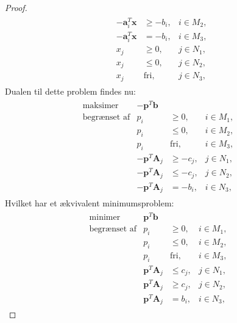 \begin{proof}
\begin{align*}
\begin{array}{lrll}
					&-\textbf{a}_i^T\textbf{x}	&\geq -b_i,	&i \in M_2,\\
					&-\textbf{a}_i^T\textbf{x}	& = -b_i,	&i \in M_3,\\
					&x_j					&\geq 0,	&j \in N_1,\\
					&x_j					&\leq 0,	&j \in N_2,\\							&x_j					&\text{fri},	&j \in N_3,
\end{array}
\end{align*}
Dualen til dette problem findes nu:
\begin{align*}
\begin{array}{lrll}
\text{maksimer}		&-\textbf{p}^T\textbf{b}	&			&\\
\text{begrænset af}	&p_i					&\geq 0,	&i \in M_1,\\
					&p_i					&\leq 0,	&i \in M_2,\\
					&p_i					&\text{fri},	&i \in M_3,\\
					&-\textbf{p}^T\textbf{A}_j	&\geq -c_j,	&j \in N_1,\\
					&-\textbf{p}^T\textbf{A}_j	&\leq -c_j,	&j \in N_2,\\
					&-\textbf{p}^T\textbf{A}_j	& = -b_i,	&i \in N_3,
\end{array}
\end{align*}
Hvilket har et ækvivalent minimumsproblem:
\begin{align*}
\begin{array}{lrll}
\text{minimer}		&\textbf{p}^T\textbf{b}	&			&\\
\text{begrænset af}	&p_i					&\geq 0,	&i \in M_1,\\
					&p_i					&\leq 0,	&i \in M_2,\\
					&p_i					&\text{fri},	&i \in M_3,\\
					&\textbf{p}^T\textbf{A}_j	&\leq c_j,	&j \in N_1,\\
					&\textbf{p}^T\textbf{A}_j	&\geq c_j,	&j \in N_2,\\
					&\textbf{p}^T\textbf{A}_j	& = b_i,	&i \in N_3,
\end{array}
\end{align*}
\end{proof}
%
